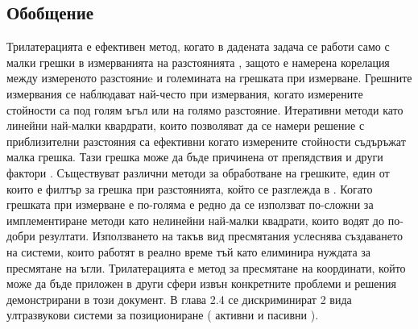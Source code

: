 \subsection{Обобщение}

Трилатерацията е ефективен метод, когато в дадената задача се работи само с малки грешки в измерванията на разстоянията \cite{trilat}, защото е намерена корелация между измереното разстояниe и големината на грешката при измерване. Грешните измервания се наблюдават най-често при измервания, когато измерените стойности са под голям ъгъл или на голямо разстояние. Итеративни методи като линейни най-малки квардрати, които позволяват да се намери решение с приблизителни разстояния са ефективни когато измерените стойности съдъръжат малка грешка. Тази грешка може да бъде причинена от препядствия и други фактори \cite{yonei}. Съществуват различни методи за обработване на грешките, един от които е филтър за грешка при разстоянията, който се разглежда в \cite{yonei}. Когато грешката при измерване е по-голяма е редно да се използват по-сложни за имплементиране методи като нелинейни най-малки квадрати, които водят до по-добри резултати. Използването на такъв вид пресмятания услеснява създаването на системи, които работят в реално време тъй като елиминира нуждата за пресмятане на ъгли. Трилатерацията е метод за пресмятане на координати, който може да бъде приложен в други сфери извън конкретните проблеми и решения демонстрирани в този документ. В глава 2.4 се дискриминират 2 вида ултразвукови системи за позициониране ( активни и пасивни ).
